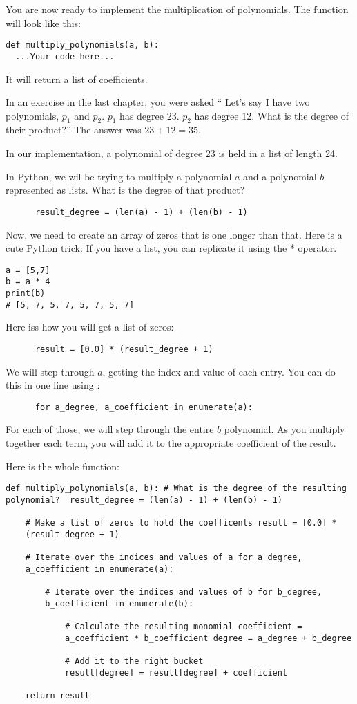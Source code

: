 You are now ready to implement the multiplication of polynomials. The function will look like this:
\begin{Verbatim}
def multiply_polynomials(a, b):
  ...Your code here...
\end{Verbatim}
It will return a list of coefficients.

In an exercise in the last chapter, you were asked `` Let's say I have
two polynomials, $p_1$ and $p_2$.  $p_1$ has degree 23.  $p_2$ has
degree 12.  What is the degree of their product?'' The answer was $23 +
12 = 35$.

In our implementation, a polynomial of degree 23 is held in a list of length 24.

In Python, we wil be trying to multiply a polynomial $a$ and a
polynomial $b$ represented as lists. What is the degree of that product?
\begin{Verbatim}
      result_degree = (len(a) - 1) + (len(b) - 1)
\end{Verbatim}

Now, we need to create an array of zeros that is one longer than that. Here is a cute Python trick: If you have a list, you can replicate it using the * operator. 
\begin{Verbatim}
a = [5,7]
b = a * 4
print(b)
# [5, 7, 5, 7, 5, 7, 5, 7]
\end{Verbatim}

Here iss how you will get a list of zeros:
\begin{Verbatim}
      result = [0.0] * (result_degree + 1)
\end{Verbatim}

We will step through $a$, getting the index and value of each entry. You can do this in one line using :
\begin{Verbatim}
      for a_degree, a_coefficient in enumerate(a):
\end{Verbatim}
For each of those, we will step through the entire $b$ polynomial. As
you multiply together each term, you will add it to the appropriate
coefficient of the result.

Here is the whole function:
\begin{Verbatim}
def multiply_polynomials(a, b): # What is the degree of the resulting
polynomial?  result_degree = (len(a) - 1) + (len(b) - 1)

    # Make a list of zeros to hold the coefficents result = [0.0] *
    (result_degree + 1)

    # Iterate over the indices and values of a for a_degree,
    a_coefficient in enumerate(a):

        # Iterate over the indices and values of b for b_degree,
        b_coefficient in enumerate(b):

            # Calculate the resulting monomial coefficient =
            a_coefficient * b_coefficient degree = a_degree + b_degree
            
            # Add it to the right bucket
            result[degree] = result[degree] + coefficient
            
    return result
\end{Verbatim}

